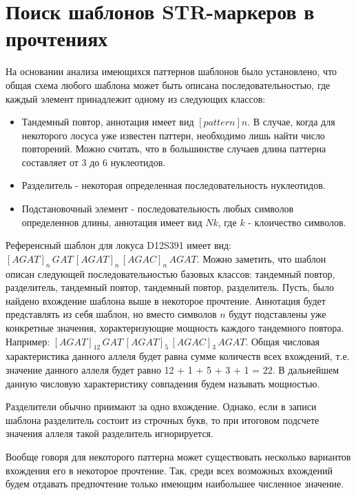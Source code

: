 \section{Поиск шаблонов STR-маркеров в прочтениях}

На основании анализа имеющихся паттернов шаблонов было установлено, что общая схема
любого шаблона может быть описана последовательностью, где каждый элемент принадлежит одному из следующих классов:
\begin{itemize}
\item Тандемный повтор, аннотация имеет вид $[pattern]n$.
В случае, когда для некоторого лосуса уже известен паттерн, необходимо лишь найти число повторений.
Можно считать, что в большинстве случаев длина паттерна составляет от 3 до 6 нуклеотидов.

\item Разделитель - некоторая определенная последовательность нуклеотидов.

\item Подстановочный элемент - последовательность любых символов определеннов длины,
аннотация имеет вид $Nk$, где $k$ - клоичество символов.
\end{itemize}

\begin{Example}
Референсный шаблон для локуса D12S391 имеет вид: $[AGAT]_{n} \, GAT \, [AGAT]_{n} \, [AGAC]_{n} \, AGAT$.
Можно заметить, что шаблон описан следующей последовательностью базовых классов:
тандемный повтор, разделитель, тандемный повтор, тандемный повтор, разделитель.
Пусть, было найдено вхождение шаблона выше в некоторое прочтение.
Аннотация будет представлять из себя шаблон, но вместо символов $n$ будут подставлены уже
конкретные значения, хорактеризующие мощность каждого тандемного повтора. Например:
$[AGAT]_{12} \, GAT \, [AGAT]_{5} \, [AGAC]_{3} \, AGAT$.
Общая числовая характеристика данного аллеля будет равна сумме количеств всех вхождений, т.е.
значение данного аллеля будет равно 12 + 1 + 5 + 3 + 1 = 22.
В дальнейшем данную числовую характеристику совпадения будем называть мощностью.
\end{Example}

\begin{Remark}
Разделители обычно приимают за одно вхождение. Однако, если в записи шаблона разделитель
состоит из строчных букв, то при итоговом подсчете значения аллеля такой разделитель игнорируется.
\end{Remark}

\begin{Remark}
Вообще говоря для некоторого паттерна может существовать несколько вариантов вхождения его в некоторое
прочтение. Так, среди всех возможных вхождений будем отдавать предпочтение только имеющим
наибольшее численное значение.
\end{Remark}

